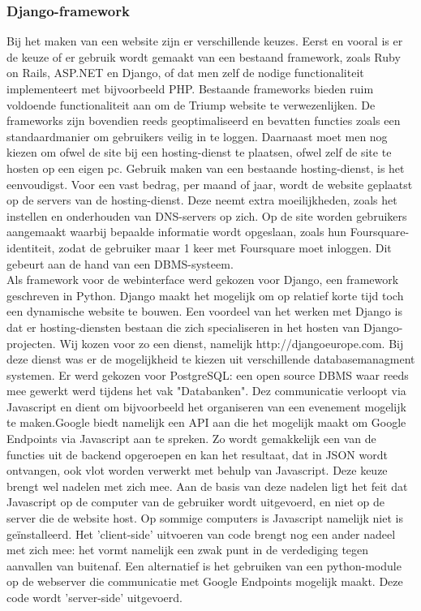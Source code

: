 \subsubsection{Django-framework}
Bij het maken van een website zijn er verschillende keuzes.
Eerst en vooral is er de keuze of er gebruik wordt gemaakt van een bestaand framework, zoals Ruby on Rails, ASP.NET en Django, of dat men zelf de nodige functionaliteit implementeert met bijvoorbeeld PHP.
Bestaande frameworks bieden ruim voldoende functionaliteit aan om de Triump website te verwezenlijken. De frameworks zijn bovendien reeds geoptimaliseerd en bevatten functies zoals een standaardmanier om gebruikers veilig in te loggen. 
Daarnaast moet men nog kiezen om ofwel de site bij een hosting-dienst te plaatsen, ofwel zelf de site te hosten op een eigen pc. Gebruik maken van een bestaande hosting-dienst, is het eenvoudigst. Voor een vast bedrag, per maand of jaar, wordt de website geplaatst op de servers van de hosting-dienst. Deze neemt extra moeilijkheden, zoals het instellen en onderhouden van DNS-servers op zich.
Op de site worden gebruikers aangemaakt waarbij bepaalde informatie wordt opgeslaan, zoals hun Foursquare-identiteit, zodat de gebruiker maar 1 keer met Foursquare moet inloggen. Dit gebeurt aan de hand van een DBMS-systeem. \\

Als framework voor de webinterface werd gekozen voor Django, een framework geschreven in Python. Django maakt het mogelijk om op relatief korte tijd toch een dynamische website te bouwen.
Een voordeel van het werken met Django is dat er hosting-diensten bestaan die zich specialiseren in het hosten van Django-projecten. Wij kozen voor zo een dienst, namelijk http://djangoeurope.com.
Bij deze dienst was er de mogelijkheid te kiezen uit verschillende databasemanagment systemen. Er werd gekozen voor PostgreSQL: een open source DBMS waar reeds mee gewerkt werd tijdens het vak "Databanken".
Dez communicatie verloopt via Javascript en dient om bijvoorbeeld het organiseren van een evenement mogelijk te maken.Google biedt namelijk een API aan die het mogelijk maakt om Google Endpoints via Javascript aan te spreken. Zo wordt gemakkelijk een van de functies uit de backend opgeroepen en kan het resultaat, dat in JSON wordt ontvangen, ook vlot worden verwerkt met behulp van Javascript. Deze keuze brengt wel nadelen met zich mee. Aan de basis van deze nadelen ligt het feit dat Javascript op de computer van de gebruiker wordt uitgevoerd, en niet op de server die de website host. Op sommige computers is Javascript namelijk niet is geïnstalleerd. Het 'client-side' uitvoeren van code brengt nog een ander nadeel met zich mee: het vormt namelijk een zwak punt in de verdediging tegen aanvallen van buitenaf. Een alternatief is het gebruiken van een python-module op de webserver die communicatie met Google Endpoints mogelijk maakt. Deze code wordt 'server-side' uitgevoerd.


